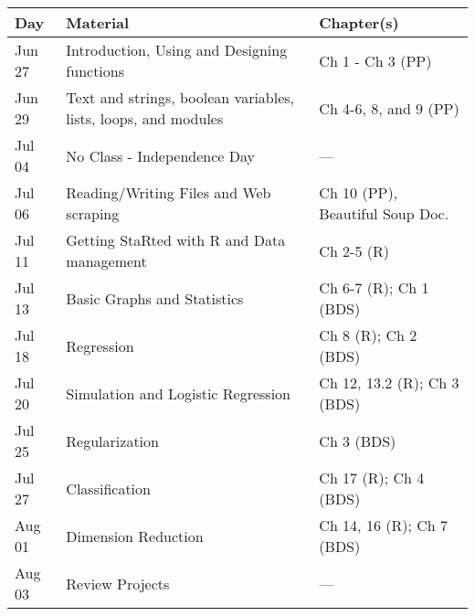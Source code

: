 \documentclass[11pt]{paper}
\begin{document}
\begin{center}
\begin{tabular}{| l | l | l |}\hline
 Day & Material & Chapter(s) \\\hline 
 Jun 27 & Introduction, Using and Designing functions & Ch 1 - Ch 3 (PP) \\
 Jun 29 & Text and strings, boolean variables, lists, loops, and modules & Ch 4-6, 8, and 9 (PP) \\
 Jul 04 & No Class - Independence Day & --- \\
 Jul 06 & Reading/Writing Files and Web scraping & Ch 10 (PP), Beautiful Soup Doc.\\
 Jul 11 & Getting StaRted with R and Data management & Ch 2-5 (R) \\
 Jul 13 & Basic Graphs and Statistics & Ch 6-7 (R); Ch 1 (BDS)\\
 Jul 18 & Regression & Ch 8 (R); Ch 2 (BDS)\\
 Jul 20 & Simulation and Logistic Regression   & Ch 12, 13.2 (R); Ch 3 (BDS)\\
 Jul 25 &  Regularization  & Ch 3 (BDS)\\
 Jul 27 & Classification & Ch 17 (R); Ch 4 (BDS)\\
 Aug 01 & Dimension Reduction & Ch 14, 16 (R); Ch 7 (BDS)\\
 Aug 03 & Review Projects & ---\\\hline
\end{tabular}
\end{center}


\end{document}
